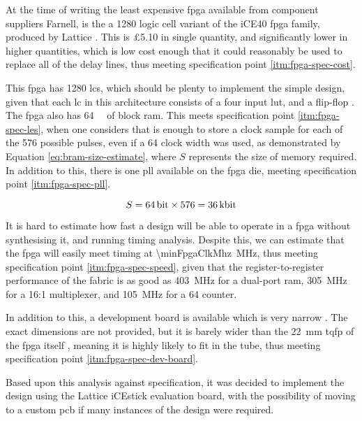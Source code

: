 At the time of writing the least expensive \gls{fpga} available from component suppliers Farnell, is the a 1280 logic cell variant of the iCE40 \gls{fpga} family, produced by Lattice \cite{farnell2017}. This is \pounds5.10 in single quantity, and significantly lower in higher quantities, which is low cost enough that it could reasonably be used to replace all of the delay lines, thus meeting specification point \ref{itm:fpga-spec-cost}.

This \gls{fpga} has 1280 \glspl{lc}, which should be plenty to implement the simple design, given that each \gls{lc} in this architecture consists of a four input \gls{lut}, and a flip-flop \cite[p.2-2]{lattice2017a}. The \gls{fpga} also has \SI{64}{\kilo\bit} of block \gls{ram}. This meets specification point \ref{itm:fpga-spec-les}, when one considers that is enough to store a clock sample for each of the 576 possible pulses, even if a \SI{64}{\bit} clock width was used, as demonstrated by Equation \ref{eq:bram-size-estimate}, where $S$ represents the size of memory required. In addition to this, there is one \gls{pll} available on the \gls{fpga} die, meeting specification point \ref{itm:fpga-spec-pll}.

\begin{equation}
	S = \SI{64}{\bit} \times 576 = \SI{36}{\kilo\bit} \label{eq:bram-size-estimate}
\end{equation}

It is hard to estimate how fast a design will be able to operate in a \gls{fpga} without synthesising it, and running timing analysis. Despite this, we can estimate that the \gls{fpga} will easily meet timing at \SI{\minFpgaClkMhz}{\mega\hertz}, thus meeting specification point \ref{itm:fpga-spec-speed}, given that the register-to-register performance of the fabric is as good as \SI{403}{\mega\hertz} for a dual-port \gls{ram}, \SI{305}{\mega\hertz} for a 16:1 multiplexer, and \SI{105}{\mega\hertz} for a \SI{64}{\bit} counter.

In addition to this, a development board is available which is very narrow \cite{lattice2017b}. The exact dimensions are not provided, but it is barely wider than the \SI{22}{\milli\metre} \gls{tqfp} of the \gls{fpga} itself \cite[p.2]{lattice2017b}, meaning it is highly likely to fit in the tube, thus meeting specification point \ref{itm:fpga-spec-dev-board}.

Based upon this analysis against specification, it was decided to implement the design using the Lattice iCEstick evaluation board, with the possibility of moving to a custom \gls{pcb} if many instances of the design were required.

